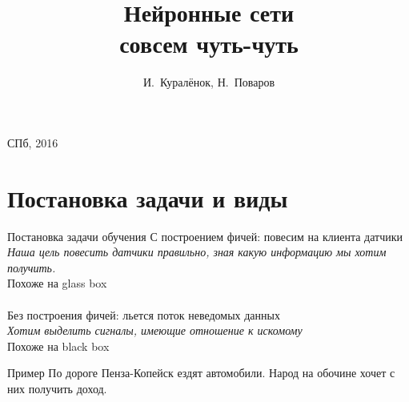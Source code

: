 \documentclass[14pt, fleqn, xcolor={dvipsnames, table}]{beamer}
\title{Нейронные сети\\\small{совсем чуть-чуть}}
\author[]{\small{%
И.~Куралёнок,
Н.~Поваров}}
\date{}
\begin{document}
\begin{frame}
\maketitle
\small
\begin{center}
\vspace{-60pt}
\vspace{80pt}
\footnotesize СПб, 2016
\end{center}
\end{frame}
\section{Постановка задачи и виды} %

\begin{frame}{Постановка задачи обучения}{}
{\color{blue}С построением фичей}: повесим на клиента датчики \\
\textit{Наша цель повесить датчики правильно, зная какую информацию мы хотим получить.}\\
Похоже на glass box\\
~\\
{\color{blue}Без построения фичей}: льется поток неведомых данных \\
\textit{Хотим выделить сигналы, имеющие отношение к искомому} \\
Похоже на black box
\end{frame}

\begin{frame}{Пример}
\small
По дороге Пенза-Копейск ездят автомобили. Народ на обочине хочет с них получить доход.\\
\footnotesize
{}
\end{frame}
\end{document}
